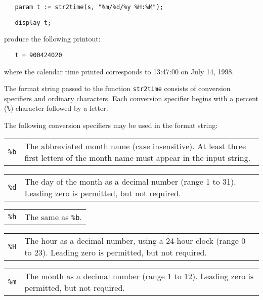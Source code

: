\documentclass[10pt]{article}
\begin{document}
\verb|   param t := str2time(s, "%m/%d/%y %H:%M");|

\verb|   display t;|

\medskip

\noindent produce the following printout:

\medskip

\verb|   t = 900424020|

\medskip

\noindent where the calendar time printed corresponds to 13:47:00 on
July 14, 1998.

\newpage

The format string passed to the function {\tt str2time} consists of
conversion specifiers and ordinary characters. Each conversion
specifier begins with a percent ({\tt\%}) character followed by a
letter.

The following conversion specifiers may be used in the format string:

\medskip

\begin{tabular}{@{}p{20pt}p{298pt}@{}}
{\tt\%b}&The abbreviated month name (case insensitive). At least three
first letters of the month name must appear in the input string.\\
\end{tabular}

\medskip

\begin{tabular}{@{}p{20pt}p{298pt}@{}}
{\tt\%d}&The day of the month as a decimal number (range 1 to 31).
Leading zero is permitted, but not required.\\
\end{tabular}

\medskip

\begin{tabular}{@{}p{20pt}p{298pt}@{}}
{\tt\%h}&The same as {\tt\%b}.\\
\end{tabular}

\medskip

\begin{tabular}{@{}p{20pt}p{298pt}@{}}
{\tt\%H}&The hour as a decimal number, using a 24-hour clock (range 0
to 23). Leading zero is permitted, but not required.\\
\end{tabular}

\medskip

\begin{tabular}{@{}p{20pt}p{298pt}@{}}
{\tt\%m}&The month as a decimal number (range 1 to 12). Leading zero is
permitted, but not required.\\
\end{tabular}
\end{document}
